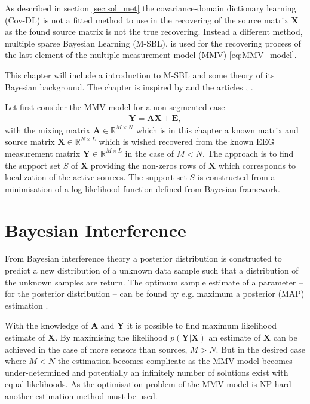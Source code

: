 As described in section \ref{sec:sol_met} the covariance-domain dictionary learning (Cov-DL) is not a fitted method to use in the recovering of the source matrix $\mathbf{X}$ as the found source matrix is not the true recovering. 
Instead a different method, multiple sparse Bayesian Learning (M-SBL), is used for the recovering process of the last element of the multiple measurement model (MMV) \ref{eq:MMV_model}.

This chapter will include a introduction to M-SBL and some theory of its Bayesian background. The chapter is inspired by \cite{phd_wipf} and the articles \cite{article_wipf}, \cite{Balkan2014}.

Let first consider the MMV model for a non-segmented case
\begin{align*}
\mathbf{Y} = \mathbf{AX} + \mathbf{E},
\end{align*}
with the mixing matrix $\mathbf{A} \in \mathbb{R}^{M \times N}$ which is in this chapter a known matrix and source matrix $\mathbf{X} \in \mathbb{R}^{N \times L}$ which is wished recovered from the known EEG measurement matrix $\mathbf{Y} \in \mathbb{R}^{M \times L}$ in the case of $M < N$. 
The approach is to find the support set $S$ of $\textbf{X}$ providing the non-zeros rows of $\mathbf{X}$ which corresponds to localization of the active sources. The support set $S$ is constructed from a minimisation of a log-likelihood function defined from Bayesian framework.

\section{Bayesian Interference}
From Bayesian interference theory a posterior distribution is constructed to predict a new distribution of a unknown data sample such that a distribution of the unknown samples are return. The optimum sample estimate of a parameter -- for the posterior distribution -- can be found by e.g. maximum a posterior (MAP) estimation .

With the knowledge of $\mathbf{A}$ and $\mathbf{Y}$ it is possible to find maximum likelihood estimate of $\textbf{X}$. 
By maximising the likelihood $p(\mathbf{Y} \vert \mathbf{X})$ an estimate of $\mathbf{X}$ can be achieved in the case of more sensors than sources, $M > N$. 
But in the desired case where $M < N$ the estimation becomes complicate as the MMV model becomes under-determined and potentially an infinitely number of solutions exist with equal likelihoods.
As the optimisation problem of the MMV model is NP-hard another estimation method must be used.

